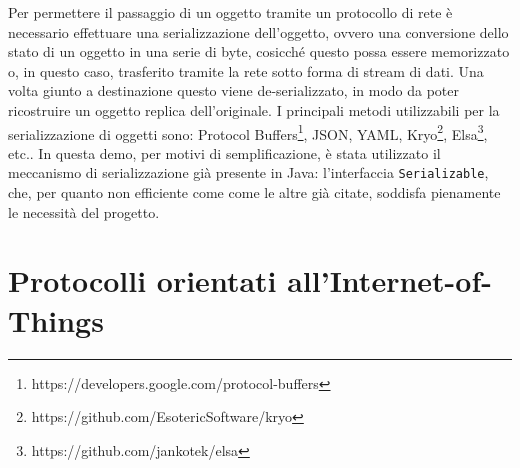 Per permettere il passaggio di un oggetto tramite un protocollo di rete è
necessario effettuare una serializzazione dell'oggetto, ovvero una conversione
dello stato di un oggetto in una serie di byte, cosicché questo possa essere
memorizzato o, in questo caso, trasferito tramite la rete sotto forma di stream
di dati. Una volta giunto a destinazione questo viene de-serializzato, in modo
da poter ricostruire un oggetto replica dell'originale. I principali metodi
utilizzabili per la serializzazione di oggetti sono: Protocol
Buffers\footnote{https://developers.google.com/protocol-buffers}, JSON, YAML,
Kryo\footnote{https://github.com/EsotericSoftware/kryo},
Elsa\footnote{https://github.com/jankotek/elsa}, etc.. In questa demo, per
motivi di semplificazione, è stata utilizzato il meccanismo di serializzazione
già presente in Java: l'interfaccia \texttt{Serializable}, che, per quanto non
efficiente come come le altre già citate, soddisfa pienamente le necessità del
progetto.

\section{Protocolli orientati all'Internet-of-Things}